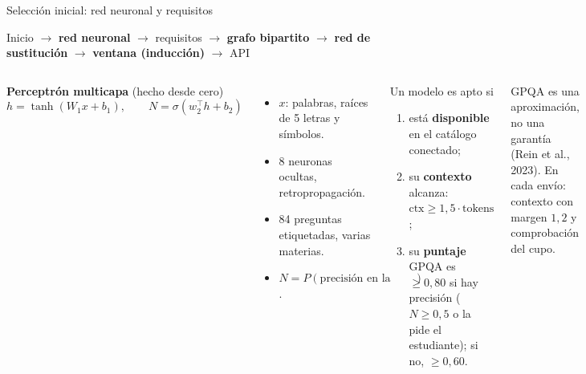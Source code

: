 \documentclass[aspectratio=169,11pt]{beamer}
\newcommand{\expone}{}
\begin{document}
\renewcommand{\expone}{Sebastián Ibañez}
\begin{frame}{Selección inicial: red neuronal y requisitos}
\begin{center}\scriptsize
Inicio $\to$ \textbf{\color{rojo}red neuronal} $\to$ requisitos $\to$ \textbf{\color{rojo}grafo bipartito} $\to$ \textbf{\color{rojo}red de sustitución} $\to$ \textbf{\color{rojo}ventana (inducción)} $\to$ API
\end{center}
\vspace{-0.3cm}
\vspace{0.2cm}
\begin{columns}[T]
\textbf{Perceptrón multicapa} (hecho desde cero)
\[
h=\tanh(W_1x+b_1),\qquad N=\sigma(w_2^{\top}h+b_2)
\]
\begin{itemize}
  \item $x$: palabras, raíces de 5 letras y símbolos.
  \item 8 neuronas ocultas, retropropagación.
  \item 84 preguntas etiquetadas, varias materias.
  \item $N = P(\text{precisión en la entrada inicial})$.
\end{itemize}
\begin{block}{Un modelo es apto si}
\begin{enumerate}
  \item está \textbf{disponible} en el catálogo conectado;
  \item su \textbf{contexto} alcanza: $\mathrm{ctx}\ge 1{,}5\cdot\text{tokens}$;
  \item su \textbf{puntaje} GPQA es $\ge 0{,}80$ si hay precisión ($N\ge0{,}5$ o la pide el estudiante); si no, $\ge 0{,}60$.
\end{enumerate}
\end{block}
{\scriptsize GPQA es una aproximación, no una garantía (Rein et al., 2023). En cada envío: contexto con margen $1{,}2$ y comprobación del cupo.}
\end{columns}
\end{frame}
\end{document}

